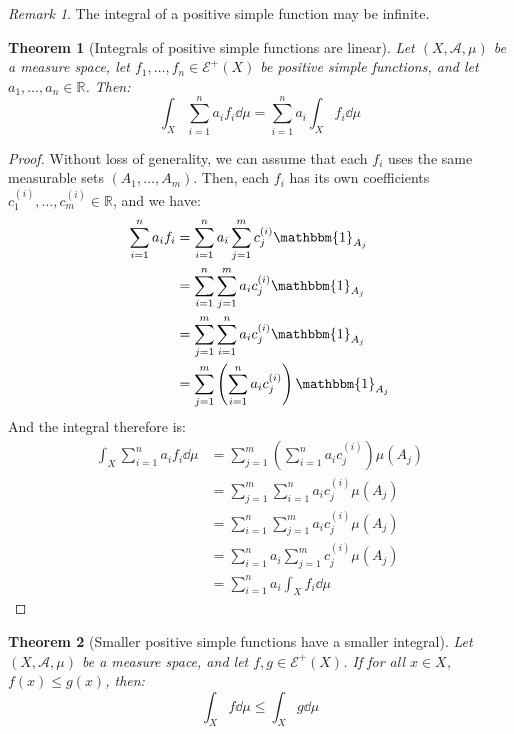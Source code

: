 \documentclass{article}
\newtheorem{theorem}{Theorem}[section]
\theoremstyle{definition}
\theoremstyle{remark}
\newtheorem*{remark}{Remark}
\theoremstyle{example}
\theoremstyle{notation}
\begin{document}
\begin{remark}
		The integral of a positive simple function may be infinite.
\end{remark}

\begin{theorem}[Integrals of positive simple functions are linear]
		Let $(X, \mathcal{A}, \mu)$ be a measure space, let $f_1, \dots, f_n \in \mathcal{E}^+(X)$ be positive simple functions, and let $a_1, \dots, a_n \in \mathbb{R}$. Then:
				$$\int_X \sum_{i=1}^n a_i f_i \dd \mu = \sum_{i=1}^n a_i \int_X f_i \dd \mu$$
\end{theorem}
		
\begin{proof}
		Without loss of generality, we can assume that each $f_i$ uses the same measurable sets $(A_1, \dots, A_m)$. Then, each $f_i$ has its own coefficients $c^{(i)}_1, \dots, c^{(i)}_m \in \mathbb{R}$, and we have:
		\begin{align*}
				\sum_{i=1}^n a_i f_i &= \sum_{i=1}^n a_i \sum_{j=1}^m c^{(i)}_j \mathbbm{1}_{A_j}\\
									 &= \sum_{i=1}^n \sum_{j=1}^m a_i c^{(i)}_j \mathbbm{1}_{A_j}\\
									 &= \sum_{j=1}^m \sum_{i=1}^n a_i c^{(i)}_j \mathbbm{1}_{A_j}\\
									 &= \sum_{j=1}^m \left( \sum_{i=1}^n a_i c^{(i)}_j \right) \mathbbm{1}_{A_j}
		\end{align*}
		And the integral therefore is:
		\begin{align*}
				\int_X \sum_{i=1}^n a_i f_i \dd \mu &= \sum_{j=1}^m \left( \sum_{i=1}^n a_i c^{(i)}_j \right) \mu(A_j)\\
													&= \sum_{j=1}^m \sum_{i=1}^n a_i c^{(i)}_j \mu(A_j)\\
													&= \sum_{i=1}^n \sum_{j=1}^m a_i c^{(i)}_j \mu(A_j)\\
													&= \sum_{i=1}^n a_i \sum_{j=1}^m c^{(i)}_j \mu(A_j)\\
													&= \sum_{i=1}^n a_i \int_X f_i \dd \mu
		\end{align*}
\end{proof}


\begin{theorem}[Smaller positive simple functions have a smaller integral] \label{thm:smaller-simple-functions-smaller-integral}
		Let $(X, \mathcal{A}, \mu)$ be a measure space, and let $f, g \in \mathcal{E}^+(X)$. If for all $x \in X$, $f(x) \leq g(x)$, then:
				$$\int_X f \dd \mu \leq \int_X g \dd \mu$$
\end{theorem}
\end{document}
